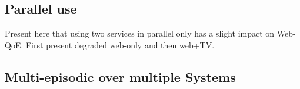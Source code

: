 \subsection{Parallel use}
Present here that using two services in parallel only has a slight impact on Web-QoE.
First present degraded web-only and then web+TV.

\subsection{Multi-episodic over multiple Systems} %